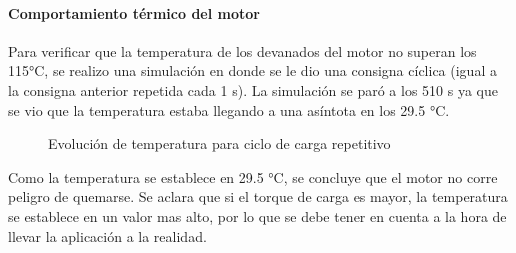 \documentclass[a4paper, 10pt, onecolumn,journal]{ieeeconf}
\begin{document}
\paragraph{\textbf{Comportamiento térmico del motor}} 
Para verificar que la temperatura de los devanados del motor no superan los 115°C, se realizo una simulación en donde se le dio una consigna cíclica (igual a la consigna anterior repetida cada 1 s). La simulación se paró a los 510 s ya que se vio que la temperatura estaba llegando a una asíntota en los 29.5 °C.
\begin{figure}[H]
	\centering
	\begin{adjustbox}{max width=\columnwidth}
	\end{adjustbox}
	\caption{Evolución de temperatura para ciclo de carga repetitivo}
	\label{Evolución de temperatura para ciclo de carga repetitivo}
\end{figure}
Como la temperatura se establece en  29.5 °C, se concluye que el motor no corre peligro de quemarse. Se aclara que si el torque de carga es mayor, la temperatura se establece en un valor mas alto, por lo que se debe tener en cuenta a la hora de llevar la aplicación a la realidad.
\end{document}
